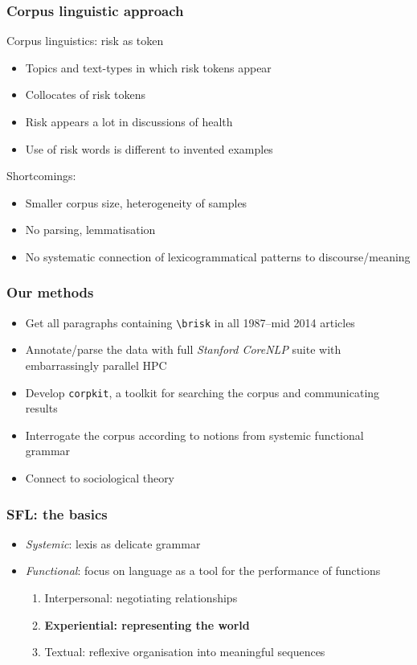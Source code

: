 \documentclass{beamer}       %
\begin{document}
\begin{frame}
    \frametitle{Corpus linguistic approach}

    Corpus linguistics: risk as token \cite{hamilton_meanings_2007}

    \begin{itemize}
    \item Topics and text-types in which risk tokens appear
    \item Collocates of risk tokens
    \item Risk appears a lot in discussions of health
    \item Use of risk words is different to invented examples
    \end{itemize}

    Shortcomings:

    \begin{itemize}
        \item Smaller corpus size, heterogeneity of samples
        \item No parsing, lemmatisation
        \item No systematic connection of lexicogrammatical patterns to discourse\slash meaning
    \end{itemize}

\end{frame}

\begin{frame}
    \frametitle{Our methods}
    
    \begin{itemize}
    \item Get all paragraphs containing \texttt{\textbackslash brisk} in all 1987--mid 2014 articles
    \item Annotate\slash parse the data with full \emph{Stanford CoreNLP} suite with embarrassingly parallel HPC
    \item Develop \texttt{corpkit}, a toolkit for searching the corpus and communicating results
    \item Interrogate the corpus according to notions from systemic functional grammar
    \item Connect to sociological theory
    \end{itemize}
\end{frame}

\begin{frame}
\frametitle{SFL: the basics}
\begin{itemize}
\item \emph{Systemic}: lexis as delicate grammar
\item \emph{Functional}: focus on language as a tool for the performance of functions
\begin{enumerate}
    \item Interpersonal: negotiating relationships
    \item \textbf{Experiential: representing the world}
    \item Textual: reflexive organisation into meaningful sequences
\end{enumerate}
\end{itemize}
\end{frame}
\end{document}
